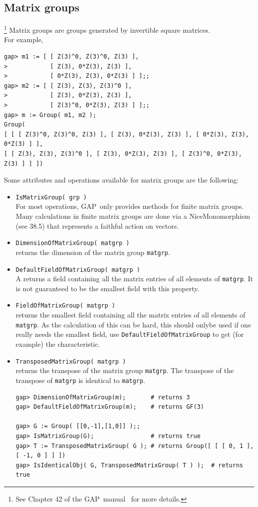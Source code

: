\documentclass[11pt]{amsart}
\newcommand{\gap}{GAP}   %
\theoremstyle{plain}
\newcommand{\codesize}{\footnotesize}
\newcommand{\<}{\ensuremath{\langle}}
\renewcommand{\>}{\ensuremath{\rangle}}
\begin{document}
\subsection{Matrix groups}\hspace{-2mm}\footnote{See Chapter 42 of the \gap\ manual~\cite{gapmanual} for more details.}
Matrix groups are groups generated by invertible square matrices.\\
For example,
{\codesize
\begin{verbatim}
gap> m1 := [ [ Z(3)^0, Z(3)^0, Z(3) ],
>            [ Z(3), 0*Z(3), Z(3) ],
>            [ 0*Z(3), Z(3), 0*Z(3) ] ];;
gap> m2 := [ [ Z(3), Z(3), Z(3)^0 ],
>            [ Z(3), 0*Z(3), Z(3) ],
>            [ Z(3)^0, 0*Z(3), Z(3) ] ];;
gap> m := Group( m1, m2 );
Group(
[ [ [ Z(3)^0, Z(3)^0, Z(3) ], [ Z(3), 0*Z(3), Z(3) ], [ 0*Z(3), Z(3), 0*Z(3) ] ],
[ [ Z(3), Z(3), Z(3)^0 ], [ Z(3), 0*Z(3), Z(3) ], [ Z(3)^0, 0*Z(3), Z(3) ] ] ])
\end{verbatim}}
\noindent Some attributes and operations available for matrix groups are the following:
\begin{itemize}
\item {\tt IsMatrixGroup( grp )}
\\[4pt]
For most operations, \gap\ only provides methods for finite matrix groups. Many calculations in finite matrix
groups are done via a NiceMonomorphism (see 38.5) that represents a faithful action on vectors.
\item {\tt DimensionOfMatrixGroup( matgrp )}\\
returns the dimension of the matrix group {\tt matgrp}.
\item {\tt DefaultFieldOfMatrixGroup( matgrp )}\\ A
returns a field containing all the matrix entries of all elements of {\tt matgrp}. 
It is not guaranteed to be the smallest field with this property.
\item {\tt FieldOfMatrixGroup( matgrp )}\\
returns the smallest field containing all the matrix entries of all elements of {\tt matgrp}. 
As the calculation of this can be hard, this should onlybe used if one really needs
the smallest field, use {\tt DefaultFieldOfMatrixGroup} to get (for example) the characteristic.
\item {\tt TransposedMatrixGroup( matgrp )}\\
returns the transpose of the matrix group {\tt matgrp}. 
The transpose of the transpose of {\tt matgrp} is identical to {\tt matgrp}.
{\codesize
\begin{verbatim}
gap> DimensionOfMatrixGroup(m);       # returns 3
gap> DefaultFieldOfMatrixGroup(m);    # returns GF(3)

gap> G := Group( [[0,-1],[1,0]] );; 
gap> IsMatrixGroup(G);                # returns true
gap> T := TransposedMatrixGroup( G ); # returns Group([ [ [ 0, 1 ], [ -1, 0 ] ] ])
gap> IsIdenticalObj( G, TransposedMatrixGroup( T ) );  # returns true

\end{verbatim}}
\end{itemize}
\end{document}
